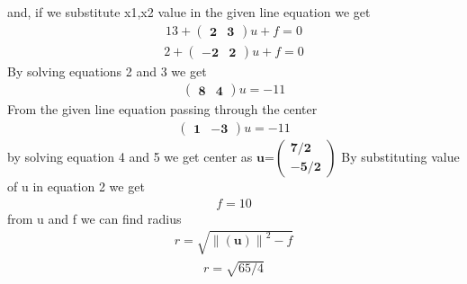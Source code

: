 \documentclass[10pt, a4paper]{article}
\providecommand{\norm}[1]{\left\lVert#1\right\rVert}
\let\vec\mathbf
\begin{document}
 and, if we substitute x1,x2 value in the given line equation we get\\
\begin{align}
13+\vec{\begin{pmatrix}2 &  3 \end{pmatrix}}u+f =0
\end{align}
 \begin{align}
2+\vec{\begin{pmatrix}-2 & 2 \end{pmatrix}}u+f =0
\end{align}
By solving equations 2 and 3 we get
 \begin{align}
\vec{\begin{pmatrix}8 & 4 \end{pmatrix}}u =-11
\end{align}
From the given line equation passing through the center
 \begin{align}
\vec{\begin{pmatrix}1 & -3 \end{pmatrix}}u=-11
\end{align}
by solving equation 4 and 5 we get center as
 $\vec{u}$=$\vec{\begin{pmatrix}7/2 \\-5/2 \end{pmatrix}}$
By substituting value of u in equation 2 we get\\ 
\begin{align}
f=10
\end{align}
from u and f we can find radius
\begin{align}
 r = \sqrt{\norm{\vec{(u)}}^2-f} 
\end{align}
\begin{align}
r = \sqrt{65/4}
\end{align}
\end{document}
